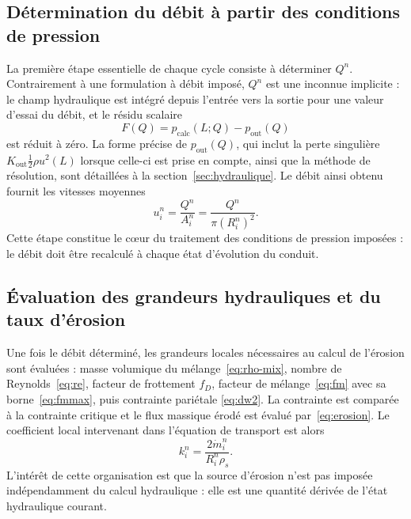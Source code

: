 \documentclass[11pt,a4paper]{report}
\newcommand{\kout}{K_{\mathrm{out}}}
\newcommand{\mdot}{\dot{m}}
\begin{document}
\subsection{Détermination du débit à partir des conditions de pression}
\label{sec:debit-implicite}

La première étape essentielle de chaque cycle consiste à déterminer \(Q^n\). Contrairement à une
formulation à débit imposé, \(Q^n\) est une inconnue implicite : le champ hydraulique est intégré depuis
l'entrée vers la sortie pour une valeur d'essai du débit, et le résidu scalaire
\begin{equation}
F(Q) = p_{\mathrm{calc}}(L; Q) - p_{\mathrm{out}}(Q)
\label{eq:residu}
\end{equation}
est réduit à zéro. La forme précise de \(p_{\mathrm{out}}(Q)\), qui inclut la perte singulière
\(\kout\frac{1}{2}\rho u^2(L)\) lorsque celle-ci est prise en compte, ainsi que la méthode de résolution,
sont détaillées à la section~\ref{sec:hydraulique}. Le débit ainsi obtenu fournit les vitesses moyennes
\begin{equation}
u_i^n = \frac{Q^n}{A_i^n} = \frac{Q^n}{\pi (R_i^n)^2}.
\label{eq:u-de-Q}
\end{equation}
Cette étape constitue le cœur du traitement des conditions de pression imposées : le débit doit être
recalculé à chaque état d'évolution du conduit.

\subsection{Évaluation des grandeurs hydrauliques et du taux d'érosion}

Une fois le débit déterminé, les grandeurs locales nécessaires au calcul de l'érosion sont évaluées :
masse volumique du mélange~\eqref{eq:rho-mix}, nombre de Reynolds~\eqref{eq:re}, facteur de frottement
\(f_D\), facteur de mélange~\eqref{eq:fm} avec sa borne~\eqref{eq:fmmax}, puis contrainte pariétale
\eqref{eq:dw2}. La contrainte est comparée à la contrainte critique et le flux massique érodé est évalué
par~\eqref{eq:erosion}. Le coefficient local intervenant dans l'équation de transport est alors
\begin{equation}
k_i^n = \frac{2\mdot_i^n}{R_i^n\rho_s}.
\label{eq:k-local}
\end{equation}
L'intérêt de cette organisation est que la source d'érosion n'est pas imposée indépendamment du calcul
hydraulique : elle est une quantité dérivée de l'état hydraulique courant.
\end{document}
